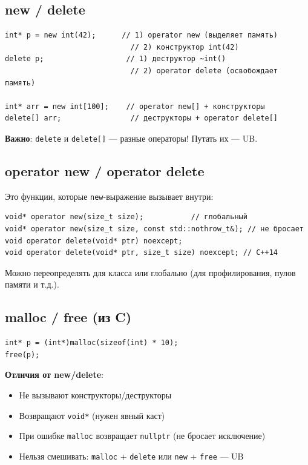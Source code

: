 \documentclass[12pt,a4paper]{article}
\begin{document}
\subsection{new / delete}

\begin{lstlisting}
int* p = new int(42);      // 1) operator new (выделяет память)
                             // 2) конструктор int(42)
delete p;                   // 1) деструктор ~int()
                             // 2) operator delete (освобождает память)

int* arr = new int[100];    // operator new[] + конструкторы
delete[] arr;                // деструкторы + operator delete[]
\end{lstlisting}

\textbf{Важно}: \texttt{delete} и \texttt{delete[]} --- разные операторы! Путать их --- UB.

\subsection{operator new / operator delete}

Это функции, которые \texttt{new}-выражение вызывает внутри:
\begin{lstlisting}
void* operator new(size_t size);           // глобальный
void* operator new(size_t size, const std::nothrow_t&); // не бросает
void operator delete(void* ptr) noexcept;
void operator delete(void* ptr, size_t size) noexcept; // C++14
\end{lstlisting}

Можно переопределять для класса или глобально (для профилирования, пулов памяти и т.д.).

\subsection{malloc / free (из C)}

\begin{lstlisting}
int* p = (int*)malloc(sizeof(int) * 10);
free(p);
\end{lstlisting}

\textbf{Отличия от new/delete}:
\begin{itemize}
    \item Не вызывают конструкторы/деструкторы
    \item Возвращают \texttt{void*} (нужен явный каст)
    \item При ошибке \texttt{malloc} возвращает \texttt{nullptr} (не бросает исключение)
    \item Нельзя смешивать: \texttt{malloc} + \texttt{delete} или \texttt{new} + \texttt{free} --- UB
\end{itemize}
\end{document}
